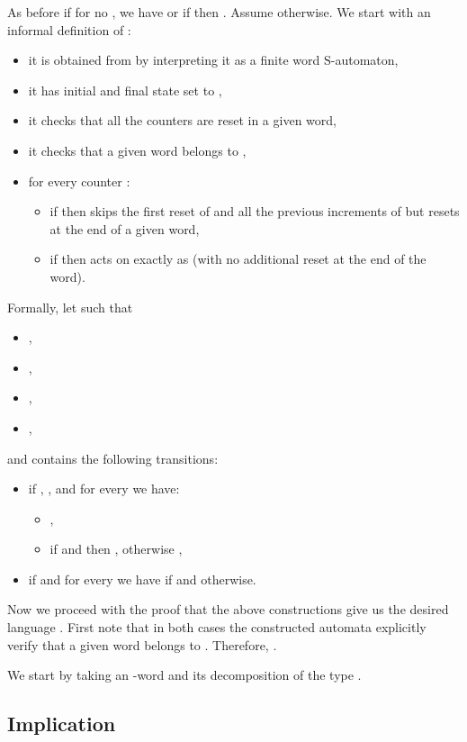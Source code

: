 \documentclass{LMCS}
\newcommand{\fS}{\ensuremath{\mathrm{S}}\xspace}
\begin{document}
As before if for no , we have  or if  then . Assume otherwise. We start with an informal definition of :
\begin{itemize}
\item it is obtained from  by interpreting it as a finite word \fS-automaton,
\item it has initial and final state set to ,
\item it checks that all the counters are reset in a given word,
\item it checks that a given word belongs to ,
\item for every counter :
\begin{itemize}
\item if  then  skips the first reset of  and all the previous increments of  but resets  at the end of a given word,
\item if  then  acts on  exactly as  (with no additional reset at the end of the word).
\end{itemize}
\end{itemize}

Formally, let  such that
\begin{itemize}
\item ,
\item ,
\item ,
\item ,
\end{itemize}
and  contains the following transitions:
\begin{itemize}
\item  if , , and for every  we have:
\begin{itemize}
\item ,
\item if  and  then , otherwise ,
\end{itemize}
\item  if  and for every  we have  if  and  otherwise.
\end{itemize}

\noindent Now we proceed with the proof that the above constructions give us the desired language . First note that in both cases the constructed automata explicitly verify that a given word belongs to . Therefore, .

We start by taking an -word  and its decomposition  of the type .

\subsection{Implication }
\end{document}
